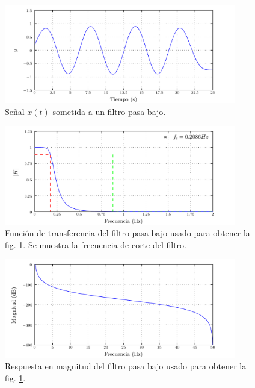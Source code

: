 \documentclass[a4paper,12pt,final]{article}
\begin{document}
      \begin{figure}[H]
        \begin{center}
          \caption{Señal $x\left(t\right)$ sometida a un filtro pasa bajo.}
          \label{p1f3}
          \vspace{-1em}
          \includegraphics[width=0.9\textwidth]{./laboratorio_5/problema01_lowpass_filtered_signal.pdf}
        \end{center}
      \end{figure}

      \begin{figure}[H]
        \begin{center}
          \caption{Función de transferencia del filtro pasa bajo usado para obtener la fig. \ref{p1f3}. Se muestra la frecuencia de corte del filtro.}
          \label{p1f4}
          \vspace{-1em}
          \includegraphics[width=0.9\textwidth]{./laboratorio_5/problema01_lowpass_transfer_function.pdf}
        \end{center}
      \end{figure}

      \begin{figure}[H]
        \begin{center}
          \caption{Respuesta en magnitud del filtro pasa bajo usado para obtener la fig. \ref{p1f3}.}
          \label{p1f5}
          \vspace{-1em}
          \includegraphics[width=0.9\textwidth]{./laboratorio_5/problema01_lowpass_filter_magnitude.pdf}
        \end{center}
      \end{figure}
\end{document}
